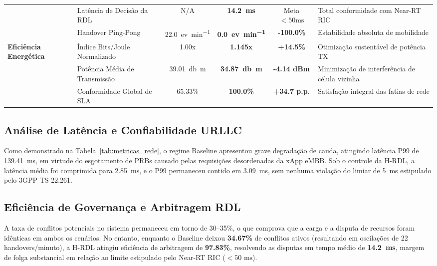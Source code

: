 \documentclass[10pt,journal,compsoc,a4paper]{IEEEtran}
\begin{document}
\begin{table}[t]
\begin{tabularx}{\textwidth}{l l c c c X}
& Latência de Decisão da RDL & N/A & \textbf{\SI{14.2}{\milli\second}} & Meta $<50\text{ms}$ & Total conformidade com Near-RT RIC \\
& Handover Ping-Pong & \SI{22.0}{ev\per\minute} & \textbf{\SI{0.0}{ev\per\minute}} & \textbf{-100.0\%} & Estabilidade absoluta de mobilidade \\
\midrule
\multirow{3}{*}{\textbf{Eficiência Energética}} 
& Índice Bits/Joule Normalizado & 1.00x & \textbf{1.145x} & \textbf{+14.5\%} & Otimização sustentável de potência TX \\
& Potência Média de Transmissão & \SI{39.01}{\decibel m} & \textbf{\SI{34.87}{\decibel m}} & \textbf{-4.14 dBm} & Minimização de interferência de célula vizinha \\
& Conformidade Global de SLA & 65.33\% & \textbf{100.0\%} & \textbf{+34.7 p.p.} & Satisfação integral das fatias de rede \\
\bottomrule
\end{tabularx}
\end{table}

\subsection{Análise de Latência e Confiabilidade URLLC}
Como demonstrado na Tabela~\ref{tab:metricas_rede}, o regime Baseline apresentou grave degradação de cauda, atingindo latência P99 de \SI{139.41}{\milli\second}, em virtude do esgotamento de PRBs causado pelas requisições desordenadas da xApp eMBB. Sob o controle da H-RDL, a latência média foi comprimida para \SI{2.85}{\milli\second}, e o P99 permaneceu contido em \SI{3.09}{\milli\second}, sem nenhuma violação do limiar de \SI{5}{\milli\second} estipulado pelo 3GPP TS 22.261.

\subsection{Eficiência de Governança e Arbitragem RDL}
A taxa de conflitos potenciais no sistema permaneceu em torno de 30--35\%, o que comprova que a carga e a disputa de recursos foram idênticas em ambos os cenários. No entanto, enquanto o Baseline deixou \textbf{34.67\%} de conflitos ativos (resultando em oscilações de 22 handovers/minuto), a H-RDL atingiu eficiência de arbitragem de \textbf{97.83\%}, resolvendo as disputas em tempo médio de \textbf{\SI{14.2}{\milli\second}}, margem de folga substancial em relação ao limite estipulado pelo Near-RT RIC ($<50\text{ ms}$).
\end{document}
